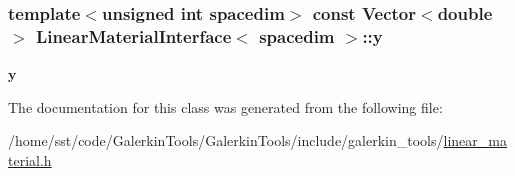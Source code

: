 \subsubsection[{\texorpdfstring{y}{y}}]{\setlength{\rightskip}{0pt plus 5cm}template$<$unsigned int spacedim$>$ const {\bf Vector}$<$double$>$ {\bf Linear\+Material\+Interface}$<$ spacedim $>$\+::y\hspace{0.3cm}{\ttfamily [private]}}\hypertarget{class_linear_material_interface_a3864513d7662e4d1c91e606467befd59}{}\label{class_linear_material_interface_a3864513d7662e4d1c91e606467befd59}
$\boldsymbol{y}$ 

The documentation for this class was generated from the following file\+:\begin{DoxyCompactItemize}
\item 
/home/sst/code/\+Galerkin\+Tools/\+Galerkin\+Tools/include/galerkin\+\_\+tools/\hyperlink{linear__material_8h}{linear\+\_\+material.\+h}\end{DoxyCompactItemize}
